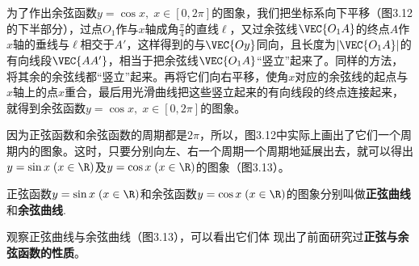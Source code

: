 \begin{figure}[htp]
    \caption{}
\end{figure}




为了作出余弦函数$y=\cos x,\; x\in [0,2\pi]$的图象，我们把坐标系向下平移（图3.12的下半部分），过点$O_1$作与$x$轴成角$\frac{\pi}{4}$的直线$\ell$，又过余弦线$\VEC{O_1A}$的终点$A$作$x$轴的垂线与$\ell$相交于$A'$，这样得到的与$\VEC{Oy}$同向，且长度为$|\VEC{O_1A}|$的有向线段$\VEC{AA'}$，相当于把余弦线$\VEC{O_1A}$“竖立”起来了。同样的方法，将其余的余弦线都“竖立”起来。再将它们向右平移，使角$x$对应的余弦线的起点与$x$轴上的点$x$重合，最后用光滑曲线把这些竖立起来的有向线段的终点连接起来，就得到余弦函数$y=\cos x,\; x\in[0,2\pi]$的图象。

因为正弦函数和余弦函数的周期都是$2\pi$，所以，图3.12中实际上画出了它们一个周期内的图象。这时，只要分别向左、右一个周期一个周期地延展出去，就可以得出$y=\sin x\; (x\in\R)$及$y=\cos x\; (x\in\R)$的图象（图3.13）。

正弦函数$y=\sin x\; (x\in\R)$和余弦函数$y=\cos x\; (x\in\R)$的图象分别叫做\textbf{正弦曲线}和\textbf{余弦曲线}.

观察正弦曲线与余弦曲线（图3.13），可以看出它们体
现出了前面研究过\textbf{正弦与余弦函数的性质}。

